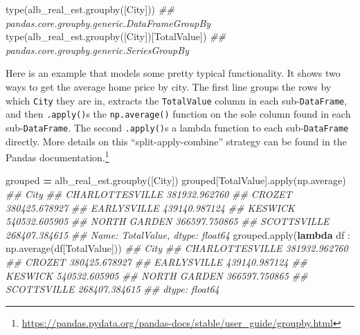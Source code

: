 \documentclass[
  12pt,
  krantz2]{krantz}
\makeatletter
\newenvironment{Shaded}{\begin{snugshade}}{\end{snugshade}}
\newcommand{\BuiltInTok}[1]{#1}
\newcommand{\CommentTok}[1]{\textcolor[rgb]{0.37,0.37,0.37}{\textit{#1}}}
\newcommand{\KeywordTok}[1]{\textcolor[rgb]{0.27,0.27,0.27}{\textbf{#1}}}
\newcommand{\NormalTok}[1]{#1}
\newcommand{\OperatorTok}[1]{\textcolor[rgb]{0.43,0.43,0.43}{\textbf{#1}}}
\newcommand{\StringTok}[1]{\textcolor[rgb]{0.5,0.5,0.5}{#1}}
\renewcommand{\href}[2]{#2\footnote{\url{#1}}}
\newenvironment{kframe}{%
\medskip{}
\setlength{\fboxsep}{.8em}
 \def\at@end@of@kframe{}%
 \ifinner\ifhmode%
  \def\at@end@of@kframe{\end{minipage}}%
  \begin{minipage}{\columnwidth}%
 \fi\fi%
 \def\FrameCommand##1{\hskip\@totalleftmargin \hskip-\fboxsep
 \colorbox{shadecolor}{##1}\hskip-\fboxsep
     \hskip-\linewidth \hskip-\@totalleftmargin \hskip\columnwidth}%
 \MakeFramed {\advance\hsize-\width
   \@totalleftmargin\z@ \linewidth\hsize
   \@setminipage}}%
 {\par\unskip\endMakeFramed%
 \at@end@of@kframe}
\renewenvironment{Shaded}{\begin{kframe}}{\end{kframe}}
\makeatother
\begin{document}
\begin{Shaded}
\begin{Highlighting}[]
\BuiltInTok{type}\NormalTok{(alb\_real\_est.groupby([}\StringTok{\textquotesingle{}City\textquotesingle{}}\NormalTok{]))}
\CommentTok{\#\# pandas.core.groupby.generic.DataFrameGroupBy}
\BuiltInTok{type}\NormalTok{(alb\_real\_est.groupby([}\StringTok{\textquotesingle{}City\textquotesingle{}}\NormalTok{])[}\StringTok{\textquotesingle{}TotalValue\textquotesingle{}}\NormalTok{])}
\CommentTok{\#\# pandas.core.groupby.generic.SeriesGroupBy}
\end{Highlighting}
\end{Shaded}

Here is an example that models some pretty typical functionality. It shows two ways to get the average home price by city. The first line groups the rows by which \texttt{City} they are in, extracts the \texttt{TotalValue} column in each sub-\texttt{DataFrame}, and then \texttt{.apply()}s the \texttt{np.average()} function on the sole column found in each sub-\texttt{DataFrame}. The second \texttt{.apply()}s a lambda function to each sub-\texttt{DataFrame} directly. More details on this ``split-apply-combine'' strategy can be found in the \href{https://pandas.pydata.org/pandas-docs/stable/user_guide/groupby.html}{Pandas documentation.}

\begin{Shaded}
\begin{Highlighting}[]
\NormalTok{grouped }\OperatorTok{=}\NormalTok{ alb\_real\_est.groupby([}\StringTok{\textquotesingle{}City\textquotesingle{}}\NormalTok{])}
\NormalTok{grouped[}\StringTok{\textquotesingle{}TotalValue\textquotesingle{}}\NormalTok{].}\BuiltInTok{apply}\NormalTok{(np.average)}
\CommentTok{\#\# City}
\CommentTok{\#\# CHARLOTTESVILLE    381932.962760}
\CommentTok{\#\# CROZET             380425.678927}
\CommentTok{\#\# EARLYSVILLE        439140.987124}
\CommentTok{\#\# KESWICK            540532.605905}
\CommentTok{\#\# NORTH GARDEN       366597.750865}
\CommentTok{\#\# SCOTTSVILLE        268407.384615}
\CommentTok{\#\# Name: TotalValue, dtype: float64}
\NormalTok{grouped.}\BuiltInTok{apply}\NormalTok{(}\KeywordTok{lambda}\NormalTok{ df : np.average(df[}\StringTok{\textquotesingle{}TotalValue\textquotesingle{}}\NormalTok{]))}
\CommentTok{\#\# City}
\CommentTok{\#\# CHARLOTTESVILLE    381932.962760}
\CommentTok{\#\# CROZET             380425.678927}
\CommentTok{\#\# EARLYSVILLE        439140.987124}
\CommentTok{\#\# KESWICK            540532.605905}
\CommentTok{\#\# NORTH GARDEN       366597.750865}
\CommentTok{\#\# SCOTTSVILLE        268407.384615}
\CommentTok{\#\# dtype: float64}
\end{Highlighting}
\end{Shaded}
\end{document}

